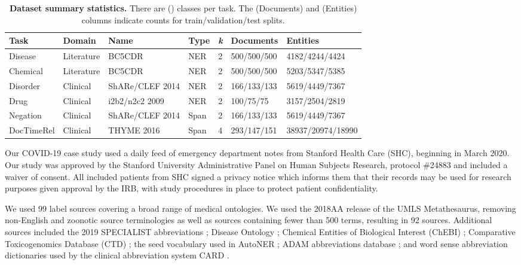 \documentclass{article}
\begin{document}
\begin{table}[]
\begin{tabular}{|l|l|l|l|l|l|l|}
\hline
{Task} & {Domain} & {Name}              & {Type} & {\emph{k}} & {Documents} & {Entities} \\ \hline
Disease       & Literature      & BC5CDR \cite{Wei2015-eh}          & NER           & 2                & 500/500/500        & 4182/4244/4424         \\ \hline
Chemical      & Literature      & BC5CDR   \cite{Wei2015-eh}          & NER           & 2                & 500/500/500        & 5203/5347/5385         \\ \hline
Disorder      & Clinical        & ShARe/CLEF 2014 \cite{Mowery2014-yx} & NER           & 2                & 166/133/133        & 5619/4449/7367         \\ \hline
Drug          & Clinical        & i2b2/n2c2 2009 \cite{Uzuner2010-il}       & NER           & 2                & 100/75/75          & 3157/2504/2819         \\ \hline
Negation      & Clinical        & ShARe/CLEF 2014 \cite{Mowery2014-yx} & Span          & 2                & 166/133/133        & 5619/4449/7367         \\  \hline
DocTimeRel   & Clinical        & THYME 2016 \cite{Bethard2016-pe}      & Span          & 4                & 293/147/151        & 38937/20974/18990      \\ \hline
\end{tabular}
\caption{\label{tbl:tasks} \textbf{Dataset summary statistics.} There are () classes per task. The (Documents) and (Entities) columns indicate counts for train/validation/test splits. }
\end{table}


Our COVID-19 case study used a daily feed of emergency department notes from Stanford Health Care (SHC), beginning in March 2020. 
Our study was approved by the Stanford University Administrative Panel on Human Subjects Research, protocol \#24883 and included a waiver of consent. All included patients from SHC signed a privacy notice which informs them that their records may be used for research purposes given approval by the IRB, with study procedures in place to protect patient confidentiality.



We used 99 label sources covering a broad range of medical ontologies. 
We used the 2018AA release of the UMLS Metathesaurus, removing non-English and zoonotic source terminologies as well as sources containing fewer than 500 terms, resulting in 92 sources. 
Additional sources included the 2019 SPECIALIST abbreviations \cite{noauthor_2009-sz}; Disease Ontology \cite{Schriml2012-ne}; Chemical Entities of Biological Interest (ChEBI) \cite{Degtyarenko2008-ni}; Comparative Toxicogenomics Database (CTD) \cite{Davis2015-px}; the seed vocabulary used in AutoNER \cite{Shang2018-sb}; ADAM abbreviations database \cite{Zhou2006-kh}; and word sense abbreviation dictionaries used by the clinical abbreviation system CARD \cite{Wu2017-ji}. 
\end{document}
